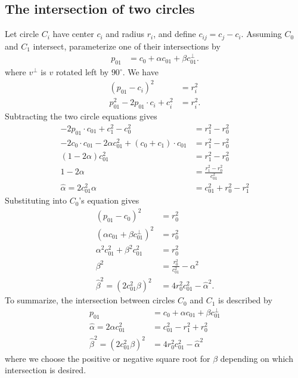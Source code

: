 \documentclass[11pt]{article}
\newcommand{\halpha}{\hat{\alpha}}
\newcommand{\hbeta}{\hat{\beta}}
\begin{document}
\subsection{The intersection of two circles}

Let circle $C_i$ have center $c_i$ and radius $r_i$, and define $c_{ij} = c_j - c_i$.  Assuming $C_0$ and $C_1$ intersect, parameterize one of their intersections by
\begin{align*}
p_{01} &= c_0 + \alpha c_{01} + \beta c_{01}^\perp.
\end{align*}
where $v^\perp$ is $v$ rotated left by $90^\circ$.  We have
\begin{align*}
(p_{01} - c_i)^2 &= r_i^2 \\
p_{01}^2 - 2p_{01} \cdot c_i + c_i^2 &= r_i^2.
\end{align*}
Subtracting the two circle equations gives
\begin{align*}
-2p_{01} \cdot c_{01} + c_1^2 - c_0^2 &= r_1^2 - r_0^2 \\
-2c_0 \cdot c_{01} -2\alpha c_{01}^2 + (c_0 + c_1) \cdot c_{01} &= r_1^2 - r_0^2 \\
(1-2\alpha) c_{01}^2 &= r_1^2 - r_0^2 \\
1 - 2 \alpha &= \frac{r_1^2 - r_0^2}{c_{01}^2} \\
\halpha = 2 c_{01}^2 \alpha &= c_{01}^2 + r_0^2 - r_1^2
\end{align*}
Substituting into $C_0$'s equation gives
\begin{align*}
(p_{01} - c_0)^2 &= r_0^2 \\
\left(\alpha c_{01} + \beta c_{01}^\perp \right)^2 &= r_0^2 \\
\alpha^2 c_{01}^2 + \beta^2 c_{01}^2 &= r_0^2 \\
\beta^2 &= \frac{r_0^2}{c_{01}^2} - \alpha^2 \\
\hbeta^2 = \left(2 c_{01}^2 \beta\right)^2 &= 4 r_0^2 c_{01}^2 - \halpha^2.
\end{align*}
To summarize, the intersection between circles $C_0$ and $C_1$ is described by
\begin{align*}
p_{01} &= c_0 + \alpha c_{01} + \beta c_{01}^\perp \\
\halpha = 2 \alpha c_{01}^2 &= c_{01}^2 - r_1^2 + r_0^2 \\
\hbeta^2 = (2c_{01}^2 \beta)^2 &= 4 r_0^2 c_{01}^2 - \halpha^2
\end{align*}
where we choose the positive or negative square root for $\beta$ depending on which intersection is desired.
\end{document}
